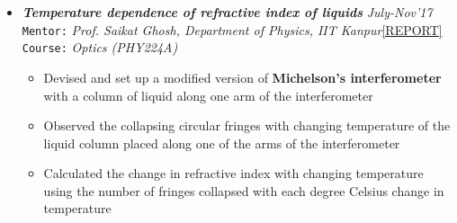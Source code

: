 \documentclass[11pt,a4paper]{article}
\begin{document}
\begin{itemize}
    \item \textbf{\textit{Temperature dependence of refractive index of liquids}} \hfill \textit{July-Nov'17}\\
    \texttt{Mentor:} \textit{Prof. Saikat Ghosh, Department of Physics, IIT Kanpur}\hfill \href{http://home.iitk.ac.in/~smit/PHY224_Project_Report.pdf}{\textsc{[REPORT]}}\\
    \texttt{Course:} \textit{Optics (PHY224A)}
    \begin{itemize}
        \item Devised and set up a modified version of \textbf{Michelson's interferometer} with a column of liquid along one arm of the interferometer
        \item Observed the collapsing circular fringes with changing temperature of the liquid column placed along one of the arms of the interferometer
        \item Calculated the change in refractive index with changing temperature using the number of fringes collapsed with each degree Celsius change in temperature
    \end{itemize}

\end{itemize}
\end{document}
